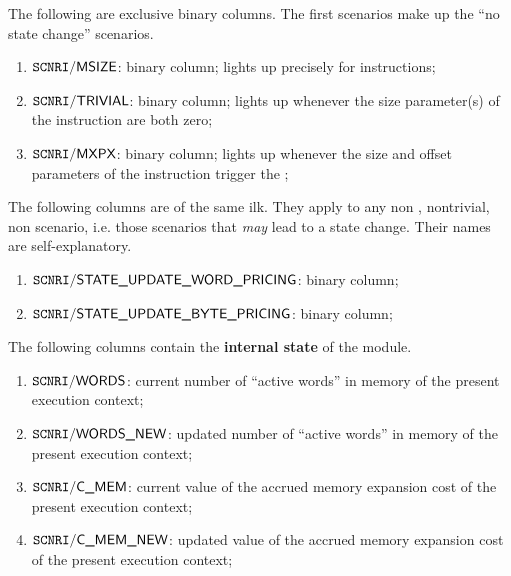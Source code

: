 The following are exclusive binary columns.
The first scenarios make up the ``no state change'' scenarios.
\begin{enumerate}
	\item $\texttt{SCNRI}\textsf{/}{\textsf{MSIZE}}$:
		binary column;
		lights up precisely for  instructions;
	\item $\texttt{SCNRI}\textsf{/}{\textsf{TRIVIAL}}$:
		binary column;
		lights up whenever the size parameter(s) of the instruction are both zero;
	\item $\texttt{SCNRI}\textsf{/}{\textsf{MXPX}}$:
		binary column;
		lights up whenever the size and offset parameters of the instruction trigger the \mxpxSH{};
\end{enumerate}
The following columns are of the same ilk.
They apply to any
non ,
nontrivial,
non \mxpxSH{} scenario,
i.e. those scenarios that \emph{may} lead to a state change.
Their names are self-explanatory.
\begin{enumerate}[resume]
	\item $\texttt{SCNRI}\textsf{/}{\textsf{STATE\_UPDATE\_WORD\_PRICING}}$:
		binary column;
	\item $\texttt{SCNRI}\textsf{/}{\textsf{STATE\_UPDATE\_BYTE\_PRICING}}$:
		binary column;
\end{enumerate}
The following columns contain the \textbf{internal state} of the \mxpMod{} module.
\begin{enumerate}[resume]
	\item $\texttt{SCNRI}\textsf{/}{\textsf{\textsf{WORDS}}}$:
		current number of ``active words'' in memory of the present execution context;
	\item $\texttt{SCNRI}\textsf{/}{\textsf{\textsf{WORDS\_NEW}}}$:
		updated number of ``active words'' in memory of the present execution context;
	\item $\texttt{SCNRI}\textsf{/}{\textsf{\textsf{C\_MEM}}}$:
		current value of the accrued memory expansion cost of the present execution context;
	\item $\texttt{SCNRI}\textsf{/}{\textsf{\textsf{C\_MEM\_NEW}}}$:
		updated value of the accrued memory expansion cost of the present execution context;
\end{enumerate}
